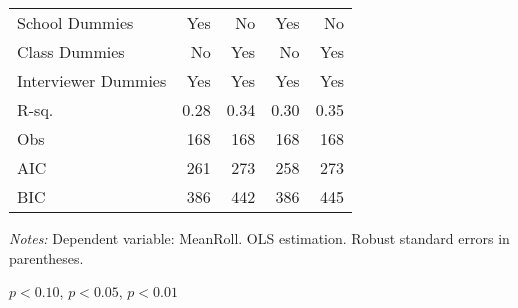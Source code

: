 \begin{table}[htbp]
\begin{threeparttable}
\begin{tabular}{l*{4}{D{.}{.}{-1}}}
School Dummies      &                 Yes   &                  No   &                 Yes   &                  No   \\
Class Dummies       &                  No   &                 Yes   &                  No   &                 Yes   \\
Interviewer Dummies &                 Yes   &                 Yes   &                 Yes   &                 Yes   \\
\midrule
R-sq.               &                0.28   &                0.34   &                0.30   &                0.35   \\
Obs                 &                 168   &                 168   &                 168   &                 168   \\
AIC                 &                 261   &                 273   &                 258   &                 273   \\
BIC                 &                 386   &                 442   &                 386   &                 445   \\
\bottomrule
\end{tabular}
\begin{tablenotes}
\footnotesize
\item \textit{Notes:} Dependent variable: MeanRoll. OLS estimation. Robust standard errors in parentheses.
\item \sym{*} \(p<0.10\), \sym{**} \(p<0.05\), \sym{***} \(p<0.01\)
\end{tablenotes}
\end{threeparttable}
\label{tab:cheat_math}
\end{table}